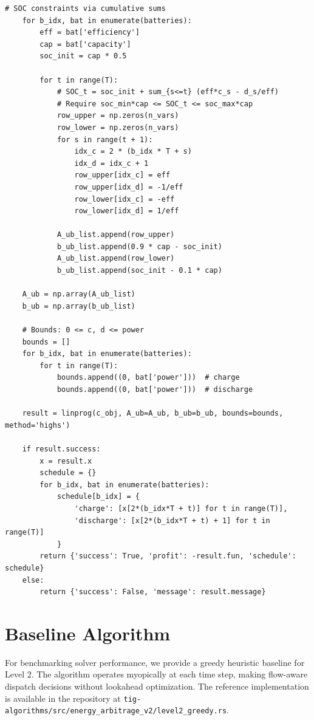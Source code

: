 \documentclass[11pt]{article}
\begin{document}
\begin{lstlisting}[style=python, caption=Level 2 Network and Portfolio]
    # SOC constraints via cumulative sums
    for b_idx, bat in enumerate(batteries):
        eff = bat['efficiency']
        cap = bat['capacity']
        soc_init = cap * 0.5
        
        for t in range(T):
            # SOC_t = soc_init + sum_{s<=t} (eff*c_s - d_s/eff)
            # Require soc_min*cap <= SOC_t <= soc_max*cap
            row_upper = np.zeros(n_vars)
            row_lower = np.zeros(n_vars)
            for s in range(t + 1):
                idx_c = 2 * (b_idx * T + s)
                idx_d = idx_c + 1
                row_upper[idx_c] = eff
                row_upper[idx_d] = -1/eff
                row_lower[idx_c] = -eff
                row_lower[idx_d] = 1/eff
            
            A_ub_list.append(row_upper)
            b_ub_list.append(0.9 * cap - soc_init)
            A_ub_list.append(row_lower)
            b_ub_list.append(soc_init - 0.1 * cap)
    
    A_ub = np.array(A_ub_list)
    b_ub = np.array(b_ub_list)
    
    # Bounds: 0 <= c, d <= power
    bounds = []
    for b_idx, bat in enumerate(batteries):
        for t in range(T):
            bounds.append((0, bat['power']))  # charge
            bounds.append((0, bat['power']))  # discharge
    
    result = linprog(c_obj, A_ub=A_ub, b_ub=b_ub, bounds=bounds, method='highs')
    
    if result.success:
        x = result.x
        schedule = {}
        for b_idx, bat in enumerate(batteries):
            schedule[b_idx] = {
                'charge': [x[2*(b_idx*T + t)] for t in range(T)],
                'discharge': [x[2*(b_idx*T + t) + 1] for t in range(T)]
            }
        return {'success': True, 'profit': -result.fun, 'schedule': schedule}
    else:
        return {'success': False, 'message': result.message}
\end{lstlisting}


\section{Baseline Algorithm}

For benchmarking solver performance, we provide a greedy heuristic baseline for Level 2. The algorithm operates myopically at each time step, making flow-aware dispatch decisions without lookahead optimization. The reference implementation is available in the repository at \texttt{tig-algorithms/src/energy\_arbitrage\_v2/level2\_greedy.rs}.
\end{document}
